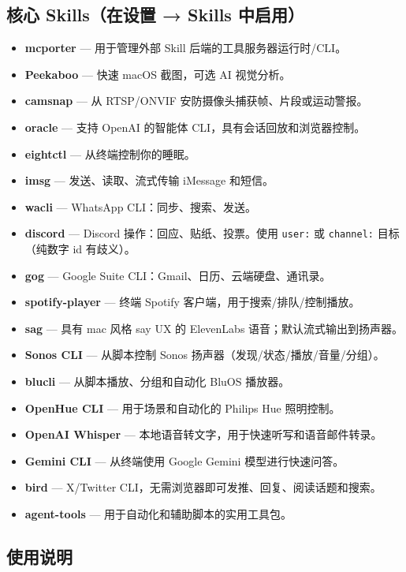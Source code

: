 \subsection{核心 Skills（在设置 → Skills 中启用）}


\begin{itemize}
  \item \textbf{mcporter} — 用于管理外部 Skill 后端的工具服务器运行时/CLI。
  \item \textbf{Peekaboo} — 快速 macOS 截图，可选 AI 视觉分析。
  \item \textbf{camsnap} — 从 RTSP/ONVIF 安防摄像头捕获帧、片段或运动警报。
  \item \textbf{oracle} — 支持 OpenAI 的智能体 CLI，具有会话回放和浏览器控制。
  \item \textbf{eightctl} — 从终端控制你的睡眠。
  \item \textbf{imsg} — 发送、读取、流式传输 iMessage 和短信。
  \item \textbf{wacli} — WhatsApp CLI：同步、搜索、发送。
  \item \textbf{discord} — Discord 操作：回应、贴纸、投票。使用 \texttt{user:} 或 \texttt{channel:} 目标（纯数字 id 有歧义）。
  \item \textbf{gog} — Google Suite CLI：Gmail、日历、云端硬盘、通讯录。
  \item \textbf{spotify-player} — 终端 Spotify 客户端，用于搜索/排队/控制播放。
  \item \textbf{sag} — 具有 mac 风格 say UX 的 ElevenLabs 语音；默认流式输出到扬声器。
  \item \textbf{Sonos CLI} — 从脚本控制 Sonos 扬声器（发现/状态/播放/音量/分组）。
  \item \textbf{blucli} — 从脚本播放、分组和自动化 BluOS 播放器。
  \item \textbf{OpenHue CLI} — 用于场景和自动化的 Philips Hue 照明控制。
  \item \textbf{OpenAI Whisper} — 本地语音转文字，用于快速听写和语音邮件转录。
  \item \textbf{Gemini CLI} — 从终端使用 Google Gemini 模型进行快速问答。
  \item \textbf{bird} — X/Twitter CLI，无需浏览器即可发推、回复、阅读话题和搜索。
  \item \textbf{agent-tools} — 用于自动化和辅助脚本的实用工具包。
\end{itemize}


\subsection{使用说明}


